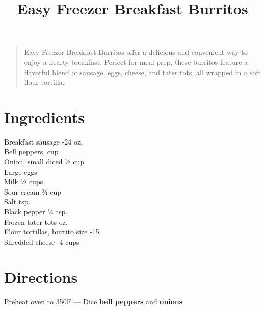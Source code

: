 \documentclass[11pt,letterpaper]{article}
\title{Easy Freezer Breakfast Burritos}
\author{}
\date{}
\begin{document}
\maketitle
\thispagestyle{empty}

\begin{quote}
\small
\begin{em}
Easy Freezer Breakfast Burritos offer a delicious and convenient way to enjoy a hearty breakfast. Perfect for meal prep, these burritos feature a flavorful blend of sausage, eggs, cheese, and tater tots, all wrapped in a soft flour tortilla.
\end{em}
\end{quote}

\section*{Ingredients}
\setlength{\columnsep}{20pt}
\begin{multicols}{2}
\noindent
    Breakfast sausage -24 oz. \\
    Bell peppers,   cup \\
    Onion, small diced \dotfill ½ cup \\
    Large eggs  \\
    Milk  ½ cups \\
    \columnbreak
    Sour cream \dotfill ¾ cup \\
    Salt  tsp. \\
    Black pepper \dotfill ¼ tsp. \\
    Frozen tater tots  oz. \\
    Flour tortillas, burrito size -15 \\
    Shredded cheese -4 cups
\end{multicols}

\section*{Directions}

\noindent
Preheat oven to 350F --- Dice \textbf{bell peppers} and \textbf{onions}
\end{document}
